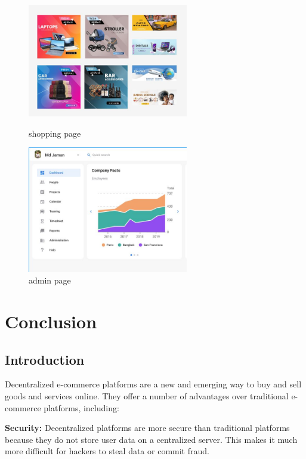 \documentclass{report}
\begin{document}
\begin{figure}[h]
    \centering
    
    \begin{minipage}{0.45\textwidth}
    \centering
    \includegraphics[width=7cm]{evaluation/03.jpeg}
    \caption{shopping page}
    \label{fig:3}
    \end{minipage}
    \hfill
    \begin{minipage}{0.45\textwidth}
    \centering
    \includegraphics[width=7cm]{evaluation/04.jpeg}
    \caption{admin page}
    \label{fig:3}
    \end{minipage}
    

\end{figure}
\newpage

\chapter{Conclusion}

\section{Introduction}



Decentralized e-commerce platforms are a new and emerging way to buy and sell goods and services online. They offer a number of advantages over traditional e-commerce platforms, including:

\textbf{Security:} Decentralized platforms are more secure than traditional platforms because they do not store user data on a centralized server. This makes it much more difficult for hackers to steal data or commit fraud.
\end{document}
